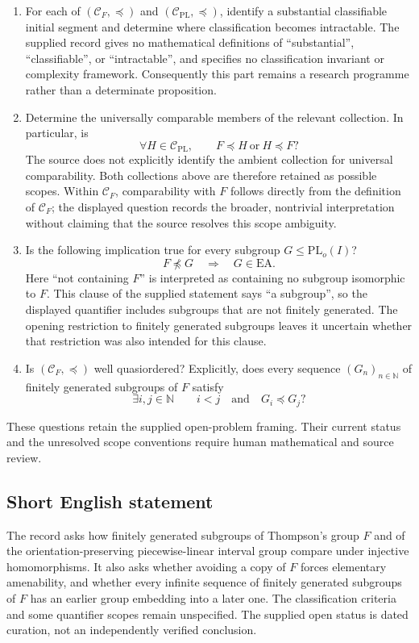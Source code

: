 \documentclass[11pt]{article}
\newcommand{\N}{\mathbb{N}}
\begin{document}
\begin{enumerate}
\item For each of \((\mathcal C_F,\preccurlyeq)\) and \((\mathcal C_{\mathrm{PL}},\preccurlyeq)\), identify a substantial classifiable initial segment and determine where classification becomes intractable. The supplied record gives no mathematical definitions of ``substantial'', ``classifiable'', or ``intractable'', and specifies no classification invariant or complexity framework. Consequently this part remains a research programme rather than a determinate proposition.
\item Determine the universally comparable members of the relevant collection. In particular, is
\[
\forall H\in\mathcal C_{\mathrm{PL}},\qquad
F\preccurlyeq H\ \text{or}\ H\preccurlyeq F?
\]
The source does not explicitly identify the ambient collection for universal comparability. Both collections above are therefore retained as possible scopes. Within \(\mathcal C_F\), comparability with \(F\) follows directly from the definition of \(\mathcal C_F\); the displayed question records the broader, nontrivial interpretation without claiming that the source resolves this scope ambiguity.
\item Is the following implication true for every subgroup \(G\leq\mathrm{PL}_o(I)\)?
\[
F\not\preccurlyeq G\quad\Longrightarrow\quad G\in\mathrm{EA}.
\]
Here ``not containing \(F\)'' is interpreted as containing no subgroup isomorphic to \(F\). This clause of the supplied statement says ``a subgroup'', so the displayed quantifier includes subgroups that are not finitely generated. The opening restriction to finitely generated subgroups leaves it uncertain whether that restriction was also intended for this clause.
\item Is \((\mathcal C_F,\preccurlyeq)\) well quasiordered? Explicitly, does every sequence \((G_n)_{n\in\N}\) of finitely generated subgroups of \(F\) satisfy
\[
\exists i,j\in\N\qquad i<j\quad\text{and}\quad G_i\preccurlyeq G_j?
\]
\end{enumerate}

These questions retain the supplied open-problem framing. Their current status and the unresolved scope conventions require human mathematical and source review.
\subsection{Short English statement}
The record asks how finitely generated subgroups of Thompson's group \(F\) and of the orientation-preserving piecewise-linear interval group compare under injective homomorphisms. It also asks whether avoiding a copy of \(F\) forces elementary amenability, and whether every infinite sequence of finitely generated subgroups of \(F\) has an earlier group embedding into a later one. The classification criteria and some quantifier scopes remain unspecified. The supplied open status is dated curation, not an independently verified conclusion.
\end{document}
